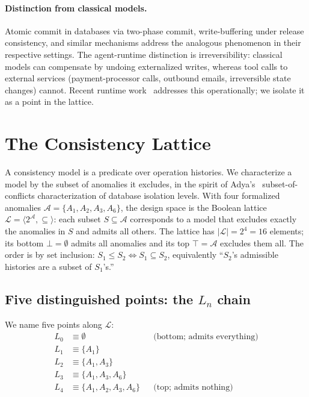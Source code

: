 \documentclass[journal,compsoc,10pt]{IEEEtran}
\providecommand{\citep}{\cite}
\theoremstyle{definition}
\theoremstyle{remark}
\begin{document}
\paragraph{Distinction from classical models.}
Atomic commit in databases via two-phase commit, write-buffering
under release consistency, and similar mechanisms address the
analogous phenomenon in their respective settings. The agent-runtime
distinction is irreversibility: classical models can compensate by
undoing externalized writes, whereas tool calls to external services
(payment-processor calls, outbound emails, irreversible state
changes) cannot. Recent runtime
work~\citep{MohammadiEtAl2026Atomix} addresses this operationally; we
isolate it as a point in the lattice.

\section{The Consistency Lattice}
\label{sec:lattice}

A consistency model is a predicate over operation histories. We
characterize a model by the subset of anomalies it excludes, in
the spirit of Adya's~\cite{Adya1999} subset-of-conflicts characterization
of database isolation levels. With four formalized anomalies
$\mathcal{A} = \{A_1, A_2, A_3, A_6\}$, the design space is the
Boolean lattice
$\mathcal{L} = \langle 2^{\mathcal{A}}, \subseteq \rangle$:
each subset $S \subseteq \mathcal{A}$ corresponds to a model
that excludes exactly the anomalies in $S$ and admits all others.
The lattice has $|\mathcal{L}| = 2^4 = 16$ elements; its bottom
$\bot = \emptyset$ admits all anomalies and its top
$\top = \mathcal{A}$ excludes them all. The order is by set
inclusion: $S_1 \le S_2 \iff S_1 \subseteq S_2$, equivalently
``$S_2$'s admissible histories are a subset of $S_1$'s.''

\subsection{Five distinguished points: the $L_n$ chain}
\label{sec:level-defs}
We name five points along $\mathcal{L}$:
\begin{align*}
  L_0 &\equiv \emptyset
        & &\text{(bottom; admits everything)} \\
  L_1 &\equiv \{A_1\} \\
  L_2 &\equiv \{A_1, A_3\} \\
  L_3 &\equiv \{A_1, A_3, A_6\} \\
  L_4 &\equiv \{A_1, A_2, A_3, A_6\}
        & &\text{(top; admits nothing)}
\end{align*}
\end{document}
